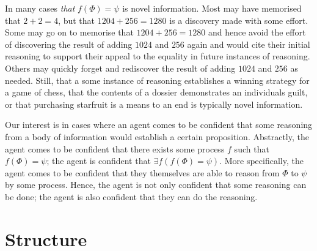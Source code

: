 \documentclass[10pt]{article}
\begin{document}
In many cases \emph{that} \(f(\Phi) = \psi\) is novel information.
Most may have memorised that \(2 + 2 = 4\), but that \(1204 + 256 = 1280\) is a discovery made with some effort.
Some may go on to memorise that \(1204 + 256 = 1280\) and hence avoid the effort of discovering the result of adding \(1024\) and \(256\) again and would cite their initial reasoning to support their appeal to the equality in future instances of reasoning.
Others may quickly forget and rediscover the result of adding \(1024\) and \(256\) as needed.
Still, that a some instance of reasoning establishes a winning strategy for a game of chess, that the contents of a dossier demonstrates an individuals guilt, or that purchasing starfruit is a means to an end is typically novel information.

Our interest is in cases where an agent comes to be confident that some reasoning from a body of information would establish a certain proposition.
Abstractly, the agent comes to be confident that there exists some process \(f\) such that \(f(\Phi) = \psi\); the agent is confident that \(\exists f(f(\Phi) = \psi)\).
More specifically, the agent comes to be confident that they themselves are able to reason from \(\Phi\) to \(\psi\) by some process.
Hence, the agent is not only confident that some reasoning can be done; the agent is also confident that they can do the reasoning.





\section*{Structure}
\label{sec:structure}
\end{document}
